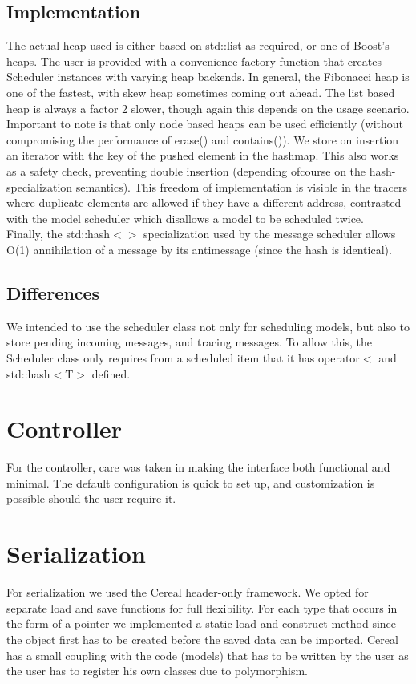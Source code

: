 \documentclass[8pt,a4paper]{report}
\begin{document}
\subsection{Implementation}
The actual heap used is either based on std::list as required, or one of Boost's heaps. The user is provided with a convenience factory function that creates Scheduler instances with varying heap backends. In general, the Fibonacci heap is one of the fastest, with skew heap sometimes coming out ahead. The list based heap is always a factor 2 slower, though again this depends on the usage scenario. \\Important to note is that only node based heaps can be used efficiently (without compromising the performance of erase() and contains()). We store on insertion an iterator with the key of the pushed element in the hashmap. This also works as a safety check, preventing double insertion (depending ofcourse on the hash-specialization semantics). This freedom of implementation is visible in the tracers where duplicate elements are allowed if they have a different address, contrasted with the model scheduler which disallows a model to be scheduled twice.\\
Finally, the std::hash$<>$ specialization used by the message scheduler allows O(1) annihilation of a message by its antimessage (since the hash is identical).
\subsection{Differences}
We intended to use the scheduler class not only for scheduling models, but also to store pending incoming messages, and tracing messages. To allow this, the Scheduler class only requires from a scheduled item that it has operator$<$ and std::hash$<$T$>$ defined.

\section{Controller}
For the controller, care was taken in making the interface both functional and minimal. The default configuration is quick to set up, and customization is possible should the user require it.

\section{Serialization}
For serialization we used the Cereal \cite{cereal} header-only framework. We opted for separate load and save functions for full flexibility. For each type that occurs in the form of a pointer we implemented a static load and construct method since the object first has to be created before the saved data can be imported. Cereal has a small coupling with the code (models) that has to be written by the user as the user has to register his own classes due to polymorphism.
\end{document}

